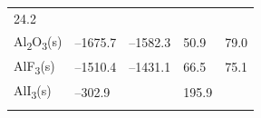 \documentclass[
  9pt,
]{extbook}
\theoremstyle{definition}
\theoremstyle{definition}
\theoremstyle{definition}
\theoremstyle{remark}
\begin{document}
\begin{longtable}[]{@{}lllll@{}}
\begin{minipage}[t]{0.18\columnwidth}
24.2\strut
\end{minipage}\tabularnewline
\begin{minipage}[t]{0.10\columnwidth}\raggedright
Al\textsubscript{2}O\textsubscript{3}(s)\strut
\end{minipage} & \begin{minipage}[t]{0.19\columnwidth}\raggedright
--1675.7\strut
\end{minipage} & \begin{minipage}[t]{0.20\columnwidth}\raggedright
--1582.3\strut
\end{minipage} & \begin{minipage}[t]{0.18\columnwidth}\raggedright
50.9\strut
\end{minipage} & \begin{minipage}[t]{0.18\columnwidth}\raggedright
79.0\strut
\end{minipage}\tabularnewline
\begin{minipage}[t]{0.10\columnwidth}\raggedright
AlF\textsubscript{3}(s)\strut
\end{minipage} & \begin{minipage}[t]{0.19\columnwidth}\raggedright
--1510.4\strut
\end{minipage} & \begin{minipage}[t]{0.20\columnwidth}\raggedright
--1431.1\strut
\end{minipage} & \begin{minipage}[t]{0.18\columnwidth}\raggedright
66.5\strut
\end{minipage} & \begin{minipage}[t]{0.18\columnwidth}\raggedright
75.1\strut
\end{minipage}\tabularnewline
\begin{minipage}[t]{0.10\columnwidth}\raggedright
AlI\textsubscript{3}(s)\strut
\end{minipage} & \begin{minipage}[t]{0.19\columnwidth}\raggedright
--302.9\strut
\end{minipage} & \begin{minipage}[t]{0.20\columnwidth}\raggedright
\strut
\end{minipage} & \begin{minipage}[t]{0.18\columnwidth}\raggedright
195.9\strut
\end{minipage} & \begin{minipage}[t]{0.18\columnwidth}\raggedright
\strut
\end{minipage}\tabularnewline
\begin{minipage}[t]{0.10\columnwidth}\raggedright

\end{minipage}
\end{longtable}
\end{document}
